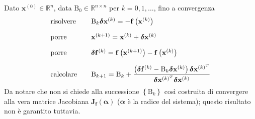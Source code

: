 \begin{itemize}
    Dato $\mathbf{x}^{\left(0\right)} \in \mathbb{R}^{n}$, data $\mathrm{B}_{0} \in \mathbb{R}^{n \times n}$ per $k = 0, 1, \dots$, fino a convergenza
    \begin{equation}\label{eq: metodo delle secanti in un sistema non lineare}
        \begin{array}{l c l}
            \text{risolvere}&& \mathrm{B}_{k}\boldsymbol{\delta}\mathbf{x}^{\left(k\right)} = -\mathbf{f}\left(\mathbf{x}^{\left(k\right)}\right) \\ [1em]
            \text{porre}    && \mathbf{x}^{\left(k+1\right)} = \mathbf{x}^{\left(k\right)} + \boldsymbol{\delta}\mathbf{x}^{\left(k\right)} \\ [1em]
            \text{porre}    && \boldsymbol{\delta}\mathbf{f}^{\left(k\right)} = \mathbf{f}\left(\mathbf{x}^{\left(k+1\right)}\right) - \mathbf{f}\left(\mathbf{x}^{\left(k\right)}\right) \\ [1em]
            \text{calcolare}&& \mathrm{B}_{k+1} = \mathrm{B}_{k} + \dfrac{
                \left(\boldsymbol{\delta}\mathbf{f}^{\left(k\right)} - \mathrm{B}_{k}\boldsymbol{\delta}\mathbf{x}^{\left(k\right)}\right)\boldsymbol{\delta}\mathbf{x}^{\left(k\right)^{T}}
            }{
                \boldsymbol{\delta}\mathbf{x}^{\left(k\right)^{T}} \boldsymbol{\delta}\mathbf{x}^{\left(k\right)}
            }
        \end{array}
    \end{equation}
    Da notare che non si chiede alla successione $\left\{\mathrm{B}_{k}\right\}$ così costruita di convergere alla vera matrice Jacobiana $\mathbf{J}_{\mathbf{f}}\left(\boldsymbol{\alpha}\right)$ ($\boldsymbol{\alpha}$ è la radice del sistema); questo risultato non è garantito tuttavia.
\end{itemize}